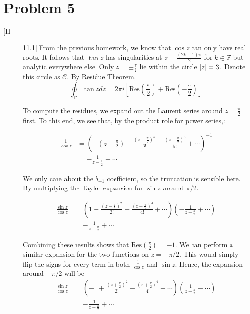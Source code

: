 \documentclass[12pt]{article}%
\newcommand{\C}{\mathcal{C}}
\begin{document}
\section{Problem 5}
\begin{description}
  \item[[H] 11.1]
  From the previous homework, we know that $\cos{z}$ can only have real roots. It follows that $\tan{z}$ has singularities at $z = \frac{(2k+1)\pi}{2}$ for $k \in \mathbb{Z}$ but analytic everywhere else. Only $z = \pm \frac{\pi}{2}$ lie within the circle $\abs{z} = 3$. Denote this circle as $\C$. By Residue Theorem,
  \[\oint_{\C} \tan{z} dz = 2 \pi i \left[ \text{Res}\left(\frac{\pi}{2}\right) + \text{Res}\left(-\frac{\pi}{2}\right)\right]\]

  To compute the residues, we expand out the Laurent series around $z = \frac{\pi}{2}$ first. To this end, we see that, by the product role for power series,:

  \begin{align*}
    \frac{1}{\cos{z}} & = \left(-(z- \frac{\pi}{2}) + \frac{(z- \frac{\pi}{2})^3}{3!} - \frac{(z- \frac{\pi}{2})^5}{5!} + \cdots \right)^{-1} \\
    & = -\frac{1}{z - \frac{\pi}{2}} + \cdots
  \end{align*}

   We only care about the $b_{-1}$ coefficient, so the truncation is sensible here. By multiplying the Taylor expansion for $\sin{z}$ around $\pi/2$:

   \begin{align*}
     \frac{\sin{z}}{\cos{z}} & = \left(1 - \frac{(z - \frac{\pi}{2})^2}{2!} + \frac{(z - \frac{\pi}{2})^4}{4!} + \cdots \right)\left(-\frac{1}{z - \frac{\pi}{2}} + \cdots \right) \\
     & = -\frac{1}{z - \frac{\pi}{2}} + \cdots
   \end{align*}

   Combining these results shows that $\text{Res}(\frac{\pi}{2}) = -1$. We can perform a similar expansion for the two functions on $z = - \pi/2$. This would simply flip the signs for every term in both $\frac{1}{\cos{z}}$ and $\sin{z}$. Hence, the expansion around $-\pi/2$ will be
   \begin{align*}
     \frac{\sin{z}}{\cos{z}} & = \left(-1 + \frac{(z + \frac{\pi}{2})^2}{2!} - \frac{(z + \frac{\pi}{2})^4}{4!} + \cdots \right)\left(\frac{1}{z + \frac{\pi}{2}} - \cdots \right) \\
     & = -\frac{1}{z + \frac{\pi}{2}} + \cdots
   \end{align*}


\end{description}
\end{document}
